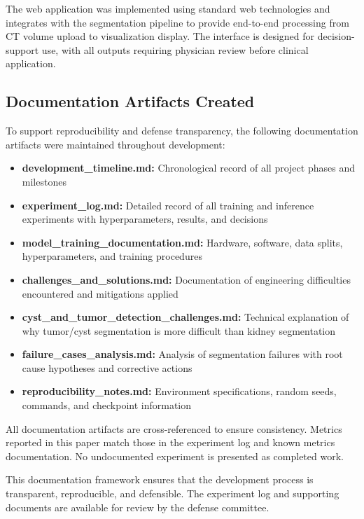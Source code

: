The web application was implemented using standard web technologies and integrates with the segmentation pipeline to provide end-to-end processing from CT volume upload to visualization display. The interface is designed for decision-support use, with all outputs requiring physician review before clinical application.

\subsection{Documentation Artifacts Created}

To support reproducibility and defense transparency, the following documentation artifacts were maintained throughout development:

\begin{itemize}
    \item \textbf{development\_timeline.md:} Chronological record of all project phases and milestones
    \item \textbf{experiment\_log.md:} Detailed record of all training and inference experiments with hyperparameters, results, and decisions
    \item \textbf{model\_training\_documentation.md:} Hardware, software, data splits, hyperparameters, and training procedures
    \item \textbf{challenges\_and\_solutions.md:} Documentation of engineering difficulties encountered and mitigations applied
    \item \textbf{cyst\_and\_tumor\_detection\_challenges.md:} Technical explanation of why tumor/cyst segmentation is more difficult than kidney segmentation
    \item \textbf{failure\_cases\_analysis.md:} Analysis of segmentation failures with root cause hypotheses and corrective actions
    \item \textbf{reproducibility\_notes.md:} Environment specifications, random seeds, commands, and checkpoint information
\end{itemize}

All documentation artifacts are cross-referenced to ensure consistency. Metrics reported in this paper match those in the experiment log and known metrics documentation. No undocumented experiment is presented as completed work.

This documentation framework ensures that the development process is transparent, reproducible, and defensible. The experiment log and supporting documents are available for review by the defense committee.


